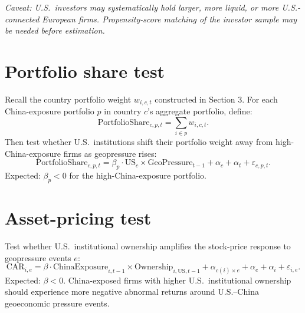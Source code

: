 \documentclass[11pt]{article}
\begin{document}
\emph{Caveat: U.S.\ investors may systematically hold larger, more liquid, or more U.S.-connected European firms. Propensity-score matching of the investor sample may be needed before estimation.}

\section{Portfolio share test}

Recall the country portfolio weight $w_{i,c,t}$ constructed in Section 3. For each China-exposure portfolio $p$ in country $c$'s aggregate portfolio, define:
\[
\text{PortfolioShare}_{c,p,t} = \sum_{i \in p} w_{i,c,t}.
\]
Then test whether U.S.\ institutions shift their portfolio weight away from high-China-exposure firms as geopressure rises:
\[
\text{PortfolioShare}_{c,p,t}
= \beta_p \cdot \text{US}_c \times \text{GeoPressure}_{t-1}
+ \alpha_c + \alpha_t + \varepsilon_{c,p,t}.
\]
Expected: $\beta_p < 0$ for the high-China-exposure portfolio.

\section{Asset-pricing test}

Test whether U.S.\ institutional ownership amplifies the stock-price response to geopressure events $e$:
\[
\text{CAR}_{i,e}
= \beta \cdot \text{ChinaExposure}_{i,t-1} \times \text{Ownership}_{i,\text{US},t-1}
+ \alpha_{c(i) \times e} + \alpha_e + \alpha_i
+ \varepsilon_{i,e}.
\]
Expected: $\beta < 0$. China-exposed firms with higher U.S.\ institutional ownership should experience more negative abnormal returns around U.S.--China geoeconomic pressure events.
\end{document}
